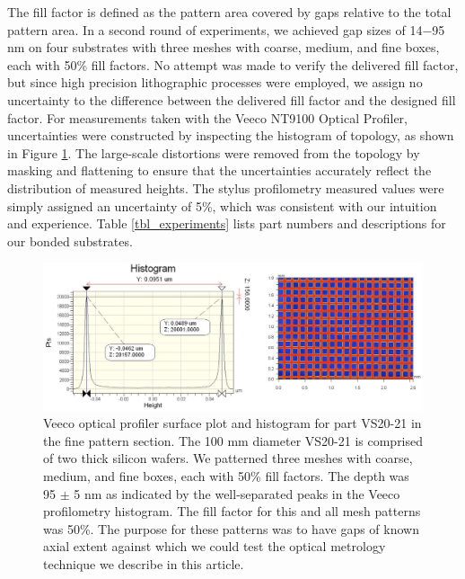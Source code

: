 \documentclass[osajnl,preprint,showpacs,superscriptaddress,12pt]{revtex4-1} %
\begin{document}
The fill factor is defined as the pattern area covered by gaps relative to the total pattern area.  In a second round of experiments, we achieved gap sizes of 14$-$95 nm on four substrates with three meshes with coarse, medium, and fine boxes, each with 50\% fill factors.  No attempt was made to verify the delivered fill factor, but since high precision lithographic processes were employed, we assign no uncertainty to the difference between the delivered fill factor and the designed fill factor.  For measurements taken with the Veeco NT9100 Optical Profiler, uncertainties were constructed by inspecting the histogram of topology, as shown in Figure \ref{figVS20pattern}.  The large-scale distortions were removed from the topology by masking and flattening to ensure that the uncertainties accurately reflect the distribution of measured heights.  The stylus profilometry measured values were simply assigned an uncertainty of 5\%, which was consistent with our intuition and experience.  Table \ref{tbl_experiments} lists part numbers and descriptions for our bonded substrates.  

\begin{figure}[htbp]
\centerline{\includegraphics[width=1.0\columnwidth]{figs/VS20fineGapCrop.pdf}}
\caption{
\label{figVS20pattern}
Veeco optical profiler surface plot and histogram for part VS20-21 in the fine pattern section.  The 100 mm diameter VS20-21 is comprised of two thick silicon wafers.  We patterned three meshes with coarse, medium, and fine boxes, each with 50\% fill factors.  The depth was 95 $\pm$ 5 nm as indicated by the well-separated peaks in the Veeco profilometry histogram.  The fill factor for this and all mesh patterns was 50\%.  The purpose for these patterns was to have gaps of known axial extent against which we could test the optical metrology technique we describe in this article.}
\end{figure}




\end{document}
